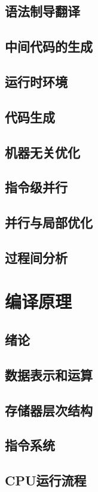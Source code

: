 \documentclass[UTF8]{ctexbook}
\begin{document}
        \section{语法制导翻译}
        \section{中间代码的生成}
        \section{运行时环境}
        \section{代码生成}
        \section{机器无关优化}
        \section{指令级并行}
        \section{并行与局部优化}
        \section{过程间分析}
    \newpage
    \chapter{编译原理}
        \section{绪论}
        \section{数据表示和运算}
        \section{存储器层次结构}
        \section{指令系统}
        \section{CPU运行流程}
\end{document}
